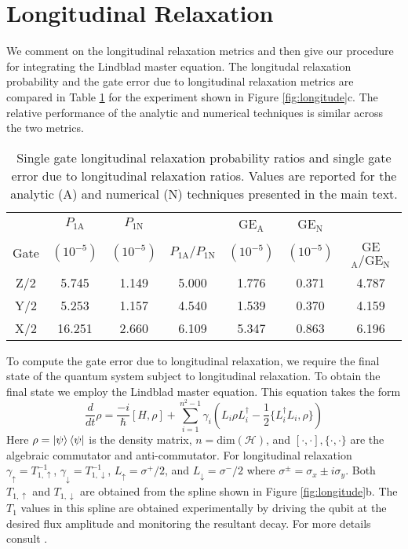 \section{Longitudinal Relaxation}
\label{appendix:longitude}
We comment on the longitudinal relaxation metrics and then give
our procedure for integrating the Lindblad master equation.
The longitudal relaxation probability and the gate error due to longitudinal
relaxation metrics are compared in Table \ref{tab:longitude} for the experiment shown in Figure \ref{fig:longitude}c.
The relative performance of the analytic and numerical techniques
is similar across the two metrics.

\begin{table}[h!]
  \begin{tabular}{c | c | c | c | c | c | c}
         & $P_{1\textrm{A}}$ & $P_{1\textrm{N}}$ & & GE$_{\textrm{A}}$ & GE$_{\textrm{N}}$ &\\
    Gate & $(10^{-5})$ & $(10^{-5})$ & $P_{1\textrm{A}}/ P_{1\textrm{N}}$ & $(10^{-5})$ &
    $(10^{-5})$ & GE$_{\textrm{A}} / \textrm{GE}_{\textrm{N}}$\\
    \hline
    Z/2 & 5.745 & 1.149 & 5.000 & 1.776 & 0.371 & 4.787\\
    Y/2 & 5.253 & 1.157 & 4.540 & 1.539 & 0.370 & 4.159\\
    X/2 & 16.251 & 2.660 & 6.109 & 5.347 & 0.863 & 6.196\\
  \end{tabular}
  \caption{
    Single gate longitudinal relaxation probability ratios
    and single gate error due to longitudinal relaxation ratios.
    Values are reported for the analytic (A) and numerical (N) techniques
    presented in the main text.
  }
  \label{tab:longitude}
\end{table}

To compute the gate error due to longitudinal relaxation,
we require the final state of the quantum system subject
to longitudinal relaxation. To obtain the final state we employ
the Lindblad master equation. This equation takes the form
\begin{equation}
  \frac{d}{dt} \rho = \frac{-i}{\hbar} [H, \rho]
  + \sum_{i = 1}^{n^{2} - 1} \gamma_{i} (L_{i} \rho L_{i}^{\dagger}
  - \frac{1}{2} \{L_{i}^{\dagger} L_{i}, \rho\})
\end{equation}
Here $\rho = \ket{\psi}\bra{\psi}$ is the density matrix, $n = \textrm{dim}(\mathcal{H})$,
and $[\cdot, \cdot], \{\cdot, \cdot \}$ are the algebraic commutator and anti-commutator.
For longitudinal relaxation $\gamma_{\uparrow} = T_{1, \uparrow}^{-1}$,
$\gamma_{\downarrow} = T_{1, \downarrow}^{-1}$,
$L_{\uparrow} = \sigma^{+}/2$, and
$L_{\downarrow} = \sigma^{-}/2$ where $\sigma^{\pm} = \sigma_{x} \pm i \sigma_{y}$.
Both $T_{1, \uparrow}$ and $T_{1, \downarrow}$ are obtained from the spline shown in Figure \ref{fig:longitude}b.
The $T_{1}$ values in this spline are obtained experimentally by driving the qubit at the desired flux amplitude
and monitoring the resultant decay. For more details consult \cite{zhang2020universal}.


